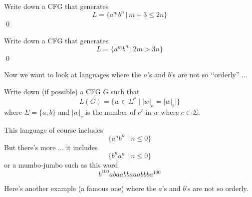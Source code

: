 \begin{ex}
Write down a CFG that generates
\[
L = \{a^m b^n \,|\, m + 3 \leq 2n\}
\]
\qed
\end{ex}
\vspace{2in}




\begin{ex}
Write down a CFG that generates
\[
L = \{a^m b^n \,|\, 2m > 3n\}
\]
\qed
\end{ex}
\vspace{2in}


\newpage
Now we want to look at languages where the $a$'s and $b$'s are not so
\lq\lq orderly'' ...

\begin{eg}
Write down (if possible) a CFG $G$ such that
\[
L(G) = \{w \in \Sigma^* \mid |w|_a = |w|_b |
\}
\]
where $\Sigma = \{a, b\}$ and $|w|_c$ is the number of $c'$  in $w$
where $c \in \Sigma$.
\end{eg}

This language of course includes 
\[
\{a^n b^n \mid n \leq 0\}
\]
But there's more ... it includes
\[
\{b^n a^n \mid n \leq 0\}
\]
or a mumbo-jumbo such as this word
\[
b^{100}abaabbaaabbba^{100}
\]

\newpage
Here's another example (a famous one) where the $a$'s and $b$'s are not
so orderly.

